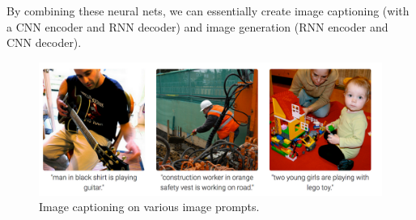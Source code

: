     By combining these neural nets, we can essentially create image captioning (with a CNN encoder and RNN decoder) and image generation (RNN encoder and CNN decoder). 

    \begin{figure}[H]
      \centering 
      \includegraphics[scale=0.2]{img/05_Encoder_Decoder/image_captioning.png}
      \caption{Image captioning on various image prompts. } 
      \label{fig:image_captioning}
    \end{figure}

